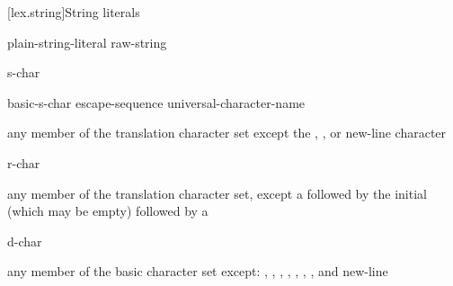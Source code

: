 [lex.string]{String literals}

%
\begin{bnf}
\br
     plain-string-literal\br
      raw-string
\end{bnf}

\begin{bnf}
\br
      
\end{bnf}

\begin{bnf}
\br
    s-char 
\end{bnf}

\begin{bnf}
\br
    basic-s-char\br
    escape-sequence\br
    universal-character-name
\end{bnf}

\begin{bnf}
\br
    \textnormal{any member of the translation character set except the ,}\br
    \bnfindent\textnormal{, or new-line character}
\end{bnf}

\begin{bnf}
\br
      \terminal{(}  \terminal{)}  
\end{bnf}

\begin{bnf}
\br
    r-char 
\end{bnf}

\begin{bnf}
\br
    \textnormal{any member of the translation character set, except a  followed by}\br
    \bnfindent\textnormal{the initial  (which may be empty) followed by a }
\end{bnf}

\begin{bnf}
\br
    d-char 
\end{bnf}

\begin{bnf}
\br
    \textnormal{any member of the basic character set except:}\br
    \bnfindent\textnormal{, , , ,}\br
    \bnfindent\textnormal{, , , and new-line}
\end{bnf}

